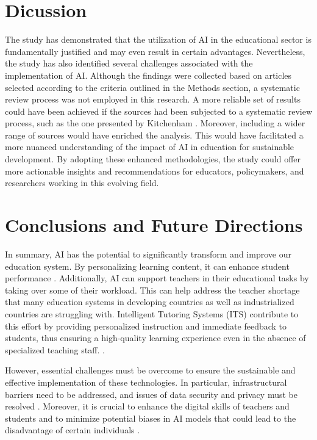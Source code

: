 \documentclass[]{lni}
\begin{document}
\section{Dicussion} %
The study has demonstrated that the utilization of AI in the educational sector is fundamentally justified and may even result in certain advantages. 
Nevertheless, the study has also identified several challenges associated with the implementation of AI.
%
Although the findings were collected based on articles selected according to the criteria outlined in the Methods section, a systematic review process was not 
employed in this research. A more reliable set of results could have been achieved if the sources had been subjected to a systematic review process, 
such as the one presented by Kitchenham \cite{kitchenham2007guidelines}.
%
Moreover, including a wider range of sources would have enriched the analysis. This would have facilitated a more nuanced understanding of the 
impact of AI in education for sustainable development. By adopting these enhanced methodologies, the study could offer more actionable insights and recommendations 
for educators, policymakers, and researchers working in this evolving field.
%
%
%
%
\section{Conclusions and Future Directions}
In summary, AI has the potential to significantly transform and improve our education system. By personalizing learning content, it can enhance student performance \cite{shemshack2020systematic} \cite{9457948}. 
Additionally, AI can support teachers in their educational tasks by taking over some of their workload. This can help address the teacher shortage that many education systems in developing countries \cite{pholphirul2023teacher} 
as well as industrialized countries \cite{porsch2023teacher} are struggling with. Intelligent Tutoring Systems (ITS) contribute to this effort by providing personalized instruction and immediate feedback to students, 
thus ensuring a high-quality learning experience even in the absence of specialized teaching staff. \cite{9670009}.

However, essential challenges must be overcome to ensure the sustainable and effective implementation of these technologies. In particular, infrastructural barriers need to be addressed, 
and issues of data security and privacy must be resolved \cite{Tanveer2020} \cite{Lin2023}. Moreover, it is crucial to enhance the digital skills of teachers and students and to minimize 
potential biases in AI models that could lead to the disadvantage of certain individuals \cite{angwin2022machine}.
\end{document}

